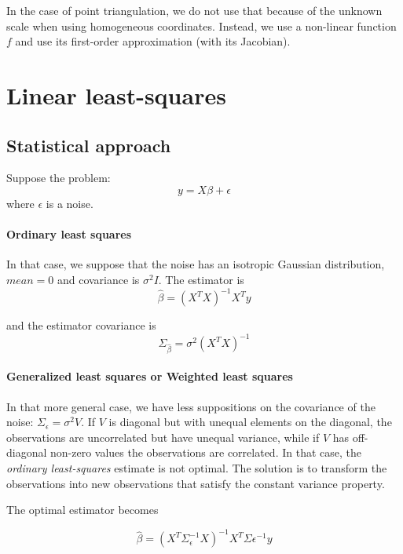 In the case of point triangulation, we do not use that because of the unknown scale when using homogeneous coordinates. Instead, we use a non-linear function $f$ and use its first-order approximation (with its Jacobian).

\section{Linear least-squares}
\subsection{Statistical approach}
Suppose the problem:
\begin{equation}
    y = X\beta + \epsilon
\end{equation}
where $\epsilon$ is a noise.

\paragraph{Ordinary least squares}
In that case, we suppose that the noise has an isotropic Gaussian distribution, $mean = 0$ and covariance is $\sigma^2I$. The estimator is 
\begin{equation}
    \hat{\beta} = (X^T X)^{-1}X^Ty
\end{equation}

and the estimator covariance is
\begin{equation}
    \Sigma_{\hat{\beta}} = \sigma^2 (X^T X)^{-1}
\end{equation}

\paragraph{Generalized least squares or Weighted least squares}

In that more general case, we have less suppositions on the covariance of the noise: $\Sigma_{\epsilon} = \sigma^2 V$. If $V$ is diagonal but with unequal elements on the diagonal, the observations are uncorrelated but have unequal variance, while if $V$ has off-diagonal non-zero values the observations are correlated. In that case, the \textit{ordinary least-squares} estimate is not optimal. The solution is to transform the observations into new observations that satisfy the constant variance property.

The optimal estimator becomes

\begin{equation}
    \hat{\beta} = (X^T \Sigma_{\epsilon}^{-1} X)^{-1} X^T \Sigma{\epsilon}^{-1} y
\end{equation}

